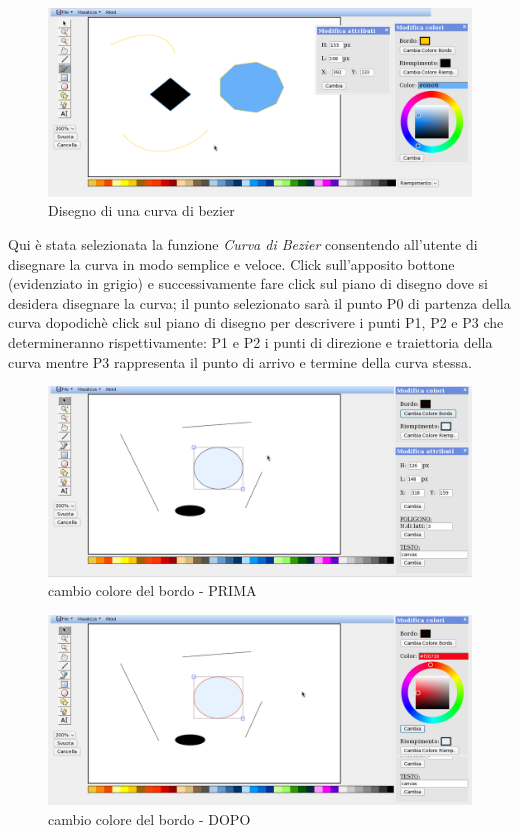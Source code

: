 \begin{figure}[!ht]
\centering
\includegraphics[scale=0.4]{images/bezier.png}
\caption{Disegno di una curva di bezier}
\end{figure} 

\vspace{100pt}
Qui \`e stata selezionata la funzione \textit{Curva di Bezier} consentendo all'utente di disegnare la curva in modo semplice e veloce.
Click sull'apposito bottone (evidenziato in grigio)  e successivamente fare click sul piano di disegno dove si desidera disegnare la curva; il punto selezionato sar\`a il punto P0 di partenza della curva dopodich\`e click sul piano di disegno per descrivere i punti P1, P2 e P3 che determineranno rispettivamente: P1 e P2 i punti di direzione e traiettoria della curva mentre P3 rappresenta il punto di arrivo e termine della curva stessa.

\begin{figure}[!ht]
\centering
\includegraphics[scale=0.4]{images/colore_bordo_prima.png}
\caption{cambio colore del bordo  - PRIMA}
\end{figure} 

\begin{figure}[!ht]
\centering
\includegraphics[scale=0.4]{images/colore_bordo_dopo.png}
\caption{cambio colore del bordo  - DOPO}
\end{figure} 


